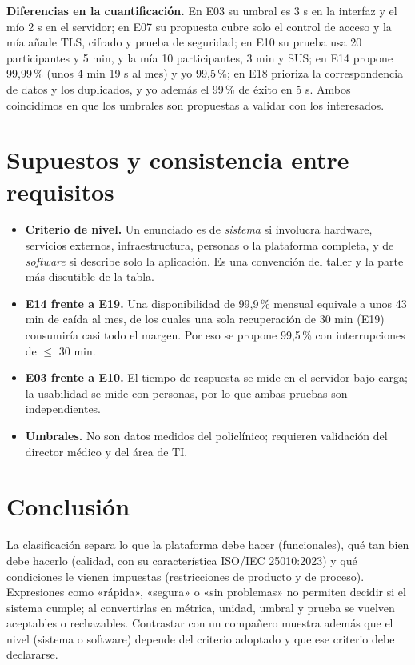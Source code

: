 \documentclass[11pt,a4paper]{article}
\begin{document}
\textbf{Diferencias en la cuantificación.} En E03 su umbral es 3 s en la interfaz y el mío 2 s en el servidor; en E07 su propuesta cubre solo el control de acceso y la mía añade TLS, cifrado y prueba de seguridad; en E10 su prueba usa 20 participantes y 5 min, y la mía 10 participantes, 3 min y SUS; en E14 propone 99,99\,\% (unos 4 min 19 s al mes) y yo 99,5\,\%; en E18 prioriza la correspondencia de datos y los duplicados, y yo además el 99\,\% de éxito en 5 s. Ambos coincidimos en que los umbrales son propuestas a validar con los interesados.

\section{Supuestos y consistencia entre requisitos}
\begin{itemize}
\item \textbf{Criterio de nivel.} Un enunciado es de \emph{sistema} si involucra hardware, servicios externos, infraestructura, personas o la plataforma completa, y de \emph{software} si describe solo la aplicación. Es una convención del taller y la parte más discutible de la tabla.
\item \textbf{E14 frente a E19.} Una disponibilidad de 99,9\,\% mensual equivale a unos 43 min de caída al mes, de los cuales una sola recuperación de 30 min (E19) consumiría casi todo el margen. Por eso se propone 99,5\,\% con interrupciones de $\leq$ 30 min.
\item \textbf{E03 frente a E10.} El tiempo de respuesta se mide en el servidor bajo carga; la usabilidad se mide con personas, por lo que ambas pruebas son independientes.
\item \textbf{Umbrales.} No son datos medidos del policlínico; requieren validación del director médico y del área de TI.
\end{itemize}

\section{Conclusión}
La clasificación separa lo que la plataforma debe hacer (funcionales), qué tan bien debe hacerlo (calidad, con su característica ISO/IEC 25010:2023) y qué condiciones le vienen impuestas (restricciones de producto y de proceso). Expresiones como «rápida», «segura» o «sin problemas» no permiten decidir si el sistema cumple; al convertirlas en métrica, unidad, umbral y prueba se vuelven aceptables o rechazables. Contrastar con un compañero muestra además que el nivel (sistema o software) depende del criterio adoptado y que ese criterio debe declararse.
\end{document}
